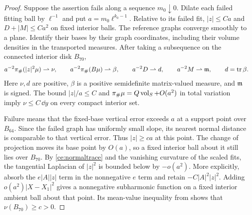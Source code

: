 \begin{proof}
Suppose the assertion fails along a sequence $m_0\downarrow0$.  Dilate
each failed fitting ball by $\ell^{-1}$ and put
$a=m_0\ell^{k_0-1}$.  Relative to its failed fit, $|z|\le Ca$ and
$D+|M|\le Ca^2$ on fixed interior balls.  The reference graphs converge
smoothly to a plane.  Identify their bases by their graph coordinates,
including their volume densities in the transported measures.  After
taking a subsequence on the connected interior disk $B_{70}$,
\begin{equation}
 \label{ce:limits}
 a^{-2}\pi_\#(|z|^2\mu)\rightharpoonup\nu,
 \qquad a^{-2}\pi_\#(B\mu)\rightharpoonup\beta,
 \qquad a^{-2}D\rightharpoonup d,
 \qquad a^{-2}M\rightharpoonup\mathfrak m,
 \qquad d=\operatorname{tr}\beta.
\end{equation}
Here $\nu,d$ are positive, $\beta$ is a positive semidefinite
matrix-valued measure, and $\mathfrak m$ is signed.  The bound
$|z|/a\le C$ and $\pi_\#\mu=Q\operatorname{vol}_S+O(a^2)$ in total variation
imply $\nu\le C\,\dd y$ on every compact interior set.

Failure means that the fixed-base vertical error exceeds $a$ at a
support point over $B_{64}$.  Since the failed graph has uniformly small
slope, its nearest normal distance is comparable to that vertical error.
Thus $|z|\ge ca$ at this point.  The change of projection moves its base
point by $O(a)$, so a fixed interior ball about it still lies over $B_{70}$.
By \eqref{ce:normaltrace} and the vanishing curvature of the
scaled fits, the tangential Laplacian of $|z|^2$ is bounded below by
$-o(a^2)$.  More explicitly, absorb the $e|A||z|$ term in the
nonnegative $e$ term and retain $-C|A|^2|z|^2$.  Adding
$o(a^2)|X-X_1|^2$ gives a nonnegative subharmonic function on a fixed
interior ambient ball about that point.  Its mean-value inequality
from  shows that $\nu(B_{70})\ge c>0$.


\end{proof}
